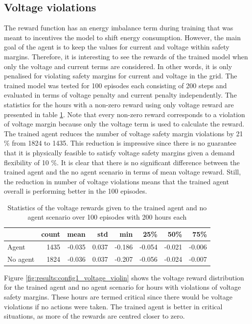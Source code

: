 \documentclass[class=book, crop=false]{standalone}
\begin{document}
\subsection{Voltage violations}
The reward function has an energy imbalance term during training that was meant to incentives the model to shift energy consumption. However, the main goal of the agent is to keep the values for current and voltage within safety margins. Therefore, it is interesting to see the rewards of the trained model when only the voltage and current terms are considered. In other words, it is only penalised for violating safety margins for current and voltage in the grid. The trained model was tested for 100 episodes each consisting of 200 steps and evaluated
in terms of voltage penalty and current penalty independently. The statistics for the hours with a non-zero reward using only voltage reward are presented in table \ref{table:results:configuration1_reward_100_episodes}. Note that every non-zero reward corresponds to a violation of voltage margin because only the voltage term is used to calculate the reward. The trained agent reduces the number of voltage safety margin violations by 21 \% from 1824 to 1435. This reduction is impressive since there is no guarantee that it is physically feasible to satisfy voltage safety margins given a demand flexibility of 10 \%. It is clear that there is no significant difference between the trained agent and the no agent scenario in terms of mean voltage reward. Still, the reduction in number of voltage violations means that the trained agent overall is performing better in the 100 episodes. 
\begin{table}[ht]
\center
\begin{tabular}{l|rrrrrrr}
         & count & mean   & std   & min    & 25\%   & 50\%   & 75\%   \\
\hline
Agent    & 1435  & -0.035 & 0.037 & -0.186 & -0.054 & -0.021 & -0.006 \\
No agent & 1824  & -0.036 & 0.037 & -0.207 & -0.056 & -0.024 & -0.007 \\
\hline
\end{tabular}
\caption{Statistics of the voltage rewards given to the trained agent and no agent scenario over 100 episodes with 200 hours each}
\label{table:results:configuration1_reward_100_episodes}
\end{table}

Figure \ref{fig:results:config1_voltage_violin} shows the voltage reward distribution for the trained agent and no agent scenario for hours with violations of voltage safety margins. These hours are termed critical since there would be voltage violations if no actions were taken. The trained agent is better in critical situations, as more of the rewards are centred closer to zero.
\end{document}
